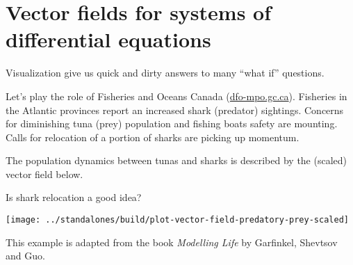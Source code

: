 \documentclass[../main.tex]{subfiles}
\begin{document}
 \section{Vector fields for systems of differential equations}

Visualization give us quick and dirty answers to many ``what if'' questions.  

\begin{example} 
  Let's play the role of Fisheries and Oceans Canada (\href{https://www.dfo-mpo.gc.ca}{\ttfamily dfo-mpo.gc.ca}).  Fisheries in the Atlantic provinces report an increased shark (predator) sightings.  Concerns for diminishing tuna (prey) population and fishing boats safety are mounting. Calls for relocation of a portion of sharks are picking up momentum. 

  The population dynamics between tunas and sharks is described by the (scaled) vector field below. 

  Is shark relocation a good idea? %

  \begin{center}
    \texttt{[image: ../standalones/build/plot-vector-field-predatory-prey-scaled]}
  \end{center}

  {\footnotesize This example is adapted from the book \emph{Modelling Life} by Garfinkel, Shevtsov and Guo.}
\end{example}
\end{document}
